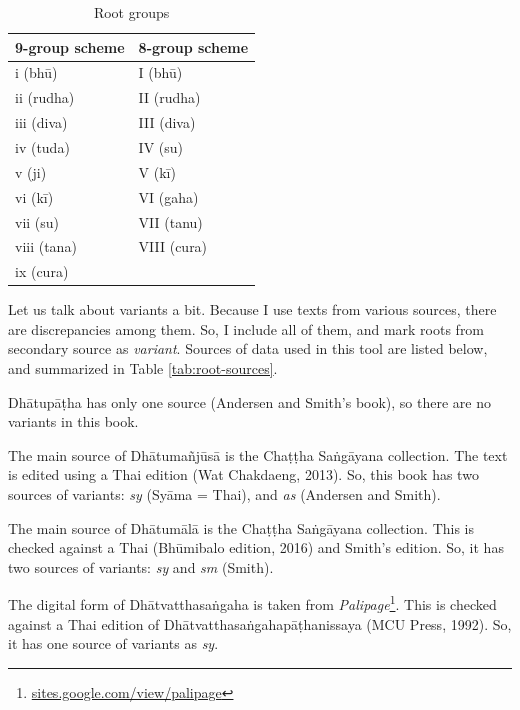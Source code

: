 
\newpage
\begin{table}[!hbt]
\centering
\caption{Root groups}
\label{tab:root-groups}
\bigskip
\begin{tabular}{ll} \toprule
\bfseries 9-group scheme & \bfseries 8-group scheme \\ \midrule
i (bhū) & I (bhū) \\
ii (rudha) & II (rudha) \\
iii (diva) & III (diva) \\
iv (tuda) & IV (su) \\
v (ji) & V (kī) \\
vi (kī) & VI (gaha) \\
vii (su) & VII (tanu) \\
viii (tana) & VIII (cura)  \\
ix (cura) &  \\
\bottomrule
\end{tabular}
\end{table}

Let us talk about variants a bit. Because I use texts from various sources, there are discrepancies among them. So, I include all of them, and mark roots from secondary source as \emph{variant}. Sources of data used in this tool are listed below, and summarized in Table \ref{tab:root-sources}.

\begin{compactitem}
\item Dhātupāṭha has only one source (Andersen and Smith's book), so there are no variants in this book.
\item The main source of Dhātumañjūsā is the Chaṭṭha Saṅgā\-yana collection. The text is edited using a Thai edition (Wat Chakdaeng, 2013). So, this book has two sources of variants: \emph{sy} (Syāma = Thai), and \emph{as} (Andersen and Smith).
\item The main source of Dhātumālā is the Chaṭṭha Saṅgāyana collection. This is checked against a Thai (Bhūmibalo edition, 2016) and Smith's edition. So, it has two sources of variants: \emph{sy} and \emph{sm} (Smith).
\item The digital form of Dhātvatthasaṅgaha is taken from \emph{Palipage}\footnote{\url{sites.google.com/view/palipage}}. This is checked against a Thai edition of Dhā\-tvatthasaṅgahapāṭhanissaya (MCU Press, 1992). So, it has one source of variants as \emph{sy}.
\end{compactitem}

